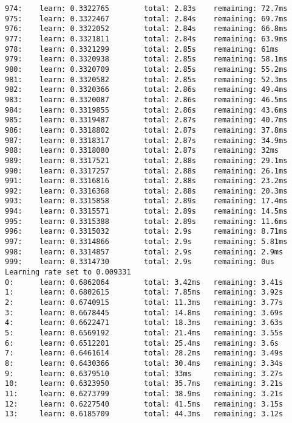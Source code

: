 \documentclass[11pt]{article}
\begin{document}
\begin{Verbatim}[commandchars=\\\{\}]
974:    learn: 0.3322765        total: 2.83s    remaining: 72.7ms
975:    learn: 0.3322467        total: 2.84s    remaining: 69.7ms
976:    learn: 0.3322052        total: 2.84s    remaining: 66.8ms
977:    learn: 0.3321811        total: 2.84s    remaining: 63.9ms
978:    learn: 0.3321299        total: 2.85s    remaining: 61ms
979:    learn: 0.3320938        total: 2.85s    remaining: 58.1ms
980:    learn: 0.3320709        total: 2.85s    remaining: 55.2ms
981:    learn: 0.3320582        total: 2.85s    remaining: 52.3ms
982:    learn: 0.3320366        total: 2.86s    remaining: 49.4ms
983:    learn: 0.3320087        total: 2.86s    remaining: 46.5ms
984:    learn: 0.3319855        total: 2.86s    remaining: 43.6ms
985:    learn: 0.3319487        total: 2.87s    remaining: 40.7ms
986:    learn: 0.3318802        total: 2.87s    remaining: 37.8ms
987:    learn: 0.3318317        total: 2.87s    remaining: 34.9ms
988:    learn: 0.3318080        total: 2.87s    remaining: 32ms
989:    learn: 0.3317521        total: 2.88s    remaining: 29.1ms
990:    learn: 0.3317257        total: 2.88s    remaining: 26.1ms
991:    learn: 0.3316816        total: 2.88s    remaining: 23.2ms
992:    learn: 0.3316368        total: 2.88s    remaining: 20.3ms
993:    learn: 0.3315858        total: 2.89s    remaining: 17.4ms
994:    learn: 0.3315571        total: 2.89s    remaining: 14.5ms
995:    learn: 0.3315388        total: 2.89s    remaining: 11.6ms
996:    learn: 0.3315032        total: 2.9s     remaining: 8.71ms
997:    learn: 0.3314866        total: 2.9s     remaining: 5.81ms
998:    learn: 0.3314857        total: 2.9s     remaining: 2.9ms
999:    learn: 0.3314730        total: 2.9s     remaining: 0us
Learning rate set to 0.009331
0:      learn: 0.6862064        total: 3.42ms   remaining: 3.41s
1:      learn: 0.6802615        total: 7.85ms   remaining: 3.92s
2:      learn: 0.6740915        total: 11.3ms   remaining: 3.77s
3:      learn: 0.6678445        total: 14.8ms   remaining: 3.69s
4:      learn: 0.6622471        total: 18.3ms   remaining: 3.63s
5:      learn: 0.6569192        total: 21.4ms   remaining: 3.55s
6:      learn: 0.6512201        total: 25.4ms   remaining: 3.6s
7:      learn: 0.6461614        total: 28.2ms   remaining: 3.49s
8:      learn: 0.6430366        total: 30.4ms   remaining: 3.34s
9:      learn: 0.6379510        total: 33ms     remaining: 3.27s
10:     learn: 0.6323950        total: 35.7ms   remaining: 3.21s
11:     learn: 0.6273799        total: 38.9ms   remaining: 3.21s
12:     learn: 0.6227540        total: 41.5ms   remaining: 3.15s
13:     learn: 0.6185709        total: 44.3ms   remaining: 3.12s

\end{Verbatim}
\end{document}
